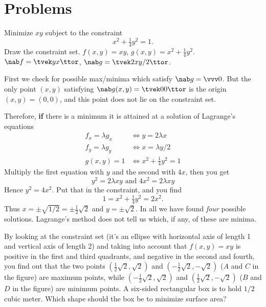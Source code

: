 \section{Problems}\problemfont    
\begin{multicols}{2}
\problem Minimize $xy$ subject to the constraint 
\[
x^2+\tfrac14 y^2 = 1.
\]
Draw the constraint set.
\answer 
$f(x, y) = xy$, $g(x, y) = x^2 + \frac14 y^2$. 
$\nab f = \tvek y \\ x\ttor$, $\nab g = \tvek 2x\\ y/2\ttor$.

First we check for possible max/minima which satisfy $\nab g=\vvv0$.
But the only point $(x,y)$ satisfying $\nab g(x,y) = \tvek0\\0\ttor$
is the origin $(x, y) = (0,0)$, and this point does not lie on the
constraint set.

Therefore, \textbf{if} there is a minimum it is attained at a solution
of Lagrange's equations
\begin{align*}
  f_x = \lambda g_x &\iff y = 2\lambda x \\
  f_y = \lambda g_y &\iff x = \lambda y/2 \\
  g(x, y) = 1 & \iff x^2+\tfrac14 y^2 = 1
\end{align*}
Multiply the first equation with $y$ and the second with $4x$, then
you get
\[
y^2 = 2\lambda xy \text{ and } 4x^2 = 2\lambda xy
\]
Hence $y^2 = 4x^2$.  Put that in the constraint, and you find 
\[
1=x^2 + \tfrac14 y^2 = 2 x^2.
\]
Thus $x= \pm\sqrt{1/2} = \pm \frac12 \sqrt{2}$ and $y = \pm \sqrt2$.
In all we have found \emph{four} possible solutions.
Lagrange's method does not tell us which, if any, of these are minima.

By looking at the constraint set (it's an ellipse with horizontal axis
of length 1 and vertical axis of length 2) and taking into account
that $f(x, y) =xy$ is positive in the first and third quadrants, and
negative in the second and fourth, you find out that the two points
$(\frac12\sqrt{2},\sqrt{2})$ and $(-\frac12\sqrt{2},-\sqrt{2})$  ($A$
and $C$ in the figure) are maximum points, while
$(-\frac12\sqrt{2},\sqrt{2})$ and $(\frac12\sqrt{2},-\sqrt{2})$  ($B$
and $D$ in the figure) are minimum points.
\endanswer
\problem A six-sided rectangular box is to hold $1/2$ cubic meter.  Which  
shape should the box be to minimize surface area?


\end{multicols}
